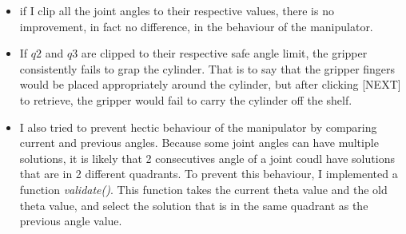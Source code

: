 \documentclass[a4paper,12pt]{report}
\begin{document}
\begin{itemize}
\item if I clip all the joint angles to their respective values, there is no improvement, in fact no difference, in the behaviour of the manipulator.

\item If $q2$ and $q3$ are clipped to their respective safe angle limit, the gripper consistently fails to grap the cylinder. That is to say that the gripper fingers would be placed appropriately around the cylinder, but after clicking [NEXT] to retrieve, the gripper would fail to carry the cylinder off the shelf.

\item I also tried to prevent hectic behaviour of the manipulator by comparing current and previous angles. Because some joint angles can have multiple solutions, it is likely that 2 consecutives angle of a joint coudl have solutions that are in 2 different quadrants. To prevent this behaviour, I implemented a function \textit{validate()}. This function takes the current theta value and the old theta value, and select the solution that is in the same quadrant as the previous angle value.

\end{itemize}
\end{document}
